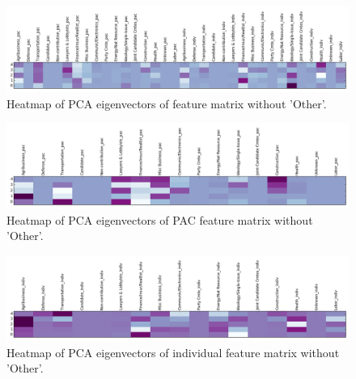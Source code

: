 \documentclass[10]{article}
\begin{document}
\begin{figure}[H]
\centering
\includegraphics[width=.9\textwidth]{../../data/features/visualize/pcs_no_other.png}
\caption{\label{fig:pc_all}Heatmap of PCA eigenvectors of feature matrix without 'Other'.}
\end{figure}
\begin{figure}[H]
\centering
\includegraphics[width=.9\textwidth]{../../data/features/visualize/pcs_no_other_pac.png}
\caption{\label{fig:pc_all}Heatmap of PCA eigenvectors of PAC feature matrix without 'Other'.}
\end{figure}
\begin{figure}[H]
\centering
\includegraphics[width=.9\textwidth]{../../data/features/visualize/pcs_no_other_indiv.png}
\caption{\label{fig:pc_indiv}Heatmap of PCA eigenvectors of individual feature matrix without 'Other'.}
\end{figure}
\end{document}
